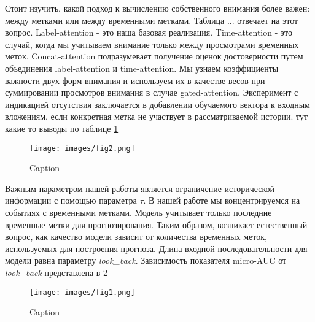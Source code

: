 \documentclass[a4paper, 12pt]{article} %
\begin{document}
Стоит изучить, какой подход к вычислению собственного внимания более важен: между метками или между временными метками.
Таблица ... отвечает на этот вопрос.
Label-attention - это наша базовая реализация. Time-attention - это случай, когда мы учитываем внимание только между просмотрами временных меток. Concat-attention подразумевает получение оценок достоверности путем объединения label-attention и time-attention. Мы узнаем коэффициенты важности двух форм внимания и используем их в качестве весов при суммировании просмотров внимания в случае gated-attention. Эксперимент с индикацией отсутствия заключается в добавлении обучаемого вектора к входным вложениям, если конкретная метка не участвует в рассматриваемой истории.
тут какие то выводы по таблице \ref{fig:fig2}
\begin{figure}
    \centering
    \texttt{[image: images/fig2.png]}
    \caption{Caption}
    \label{fig:fig2}
\end{figure}

Важным параметром нашей работы является ограничение исторической информации с помощью параметра $\tau$. В нашей работе мы концентрируемся на событиях с временными метками. Модель учитывает только последние временные метки для прогнозирования. Таким образом, возникает естественный вопрос, как качество модели зависит от количества временных меток, используемых для построения прогноза. Длина входной последовательности для модели равна параметру \textit{look\_back}. Зависимость показателя micro-AUC от \textit{look\_back} представлена в \ref{fig:fig1}

\begin{figure}
    \centering
    \texttt{[image: images/fig1.png]}
    \caption{Caption}
    \label{fig:fig1}
\end{figure}
 


\end{document}
